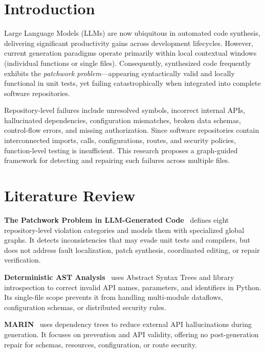 \documentclass[10pt,a4paper]{article}
\begin{document}
\setcounter{page}{1}
\fontsize{9.3}{11.2}\selectfont

\section{Introduction}
Large Language Models (LLMs) are now ubiquitous in automated code synthesis, delivering significant productivity gains across development lifecycles. However, current generation paradigms operate primarily within local contextual windows (individual functions or single files). Consequently, synthesized code frequently exhibits the \emph{patchwork problem}---appearing syntactically valid and locally functional in unit tests, yet failing catastrophically when integrated into complete software repositories.

Repository-level failures include unresolved symbols, incorrect internal APIs, hallucinated dependencies, configuration mismatches, broken data schemas, control-flow errors, and missing authorization. Since software repositories contain interconnected imports, calls, configurations, routes, and security policies, function-level testing is insufficient. This research proposes a graph-guided framework for detecting and repairing such failures across multiple files.

\section{Literature Review}
\textbf{The Patchwork Problem in LLM-Generated Code}~\cite{patchwork} defines eight repository-level violation categories and models them with specialized global graphs. It detects inconsistencies that may evade unit tests and compilers, but does not address fault localization, patch synthesis, coordinated editing, or repair verification.

\textbf{Deterministic AST Analysis}~\cite{astpaper} uses Abstract Syntax Trees and library introspection to correct invalid API names, parameters, and identifiers in Python. Its single-file scope prevents it from handling multi-module dataflows, configuration schemas, or distributed security rules.

\textbf{MARIN}~\cite{marin} uses dependency trees to reduce external API hallucinations during generation. It focuses on prevention and API validity, offering no post-generation repair for schemas, resources, configuration, or route security.
\end{document}
